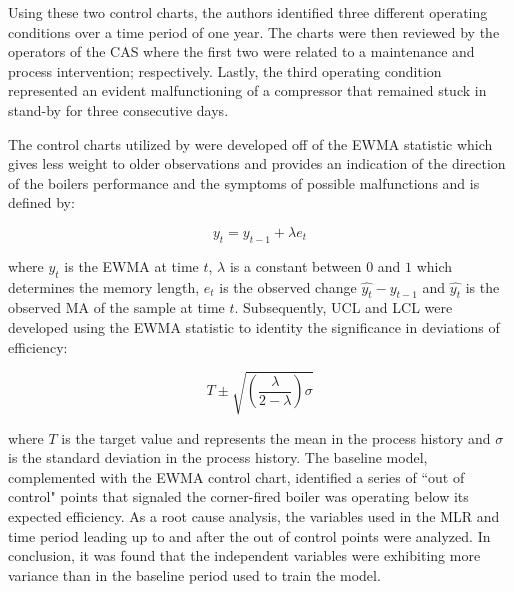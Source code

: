Using these two control charts, the authors identified three different operating conditions over a time period of one year. The charts were then reviewed by the operators of the CAS where the first two were related to a maintenance and process intervention; respectively. Lastly, the third operating condition represented an evident malfunctioning of a compressor that remained stuck in stand-by for three consecutive days.

The control charts utilized by \cite{boiler} were developed off of the \ac{EWMA} statistic which gives less weight to older observations and provides an indication of the direction of the boilers performance and the symptoms of possible malfunctions and is defined by:

\begin{equation}
    y_t = y_{t-1} + \lambda e_t
\end{equation}

where $y_t$ is the EWMA at time $t$, $\lambda$ is a constant between $0$ and $1$ which determines the memory length, $e_t$ is the observed change $\hat{y_t} - y_{t-1}$ and $\hat{y_t}$ is the observed MA of the sample at time $t$. Subsequently, UCL and LCL were developed using the EWMA statistic to identity the significance in deviations of efficiency:

\begin{equation}
    T \pm \sqrt{(\frac{\lambda}{2 - \lambda})\sigma}
\end{equation}

where $T$ is the target value and represents the mean in the process history and $\sigma$ is the standard deviation in the process history. The baseline model, complemented with the EWMA control chart, identified a series of ``out of control" points that signaled the corner-fired boiler was operating below its expected efficiency. As a root cause analysis, the variables used in the MLR and time period leading up to and after the out of control points were analyzed. In conclusion, it was found that the independent variables were exhibiting more variance than in the baseline period used to train the model.